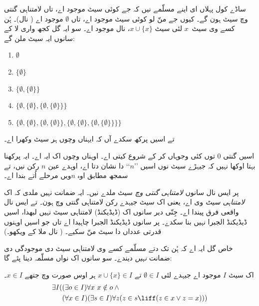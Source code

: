 \documentclass[../../../include/open-logic-section]{subfiles}
\begin{document}

ساڈے کول پہلاں ای اینے مسلّمے نیں کہ جے کوئی سیٹ موجود اے، تاں لامتناہی
گنتی وچ سیٹ ہون گے۔ کیوں جے منّ لو کوئی سیٹ موجود اے، تاں
$\emptyset$ موجود اے ( نال)۔
ہُن کسے وی سیٹ~$x$ لئی سیٹ $x \cup \{x\}$،
 نال موجود اے۔
سو ایہ گل کجھ واری لا کے سانوں ایہ سیٹ ملن گے:
\begin{enumerate}
	\item[0.] $\emptyset$ %
	\item[1.] $ \{\emptyset\}$ %
	\item[2.] $\{\emptyset, \{\emptyset\}\}$ %
	\item[3.] $\{\emptyset, \{\emptyset\}, \{\emptyset, \{\emptyset\}\}\}$ %
	\item[4.] $\{\emptyset, \{\emptyset\}, \{\emptyset, \{\emptyset\}\}, \{\emptyset, \{\emptyset\}, \{\emptyset, \{\emptyset\}\}\}\}$%
\end{enumerate}
تے اسیں پرکھ سکدے آں کہ ایہناں وچوں ہر سیٹ وکھرا اے۔

اسیں گنتی $0$ توں کئی وجوہاں کر کے شروع کیتی اے۔ اوہناں وچوں اک ایہ اے۔
ایہ پرکھنا بہتا اوکھا نہیں کہ جیہڑے سیٹ نوں اسیں ’’$n$‘‘ دا نشان دتا اے،
اوہدے عین $n$ رکن نیں، تے سمجھ مطابق اوہ $n$ویں مرحلے اُتے بندا اے۔

پر ایس نال سانوں \emph{لامتناہی گنتی وچ} سیٹ ملدے نیں۔ ایہ ضمانت نہیں
ملدی کہ اک \emph{لامتناہی سیٹ} وی اے، یعنی اک سیٹ جیہدے رکن لامتناہی
گنتی وچ ہون۔ تے ایس نال واقعی فرق پیندا اے۔ جِنّی دیر سانوں اک (ڈیڈیکنڈ)
لامتناہی سیٹ نہیں لبھدا، اسیں ڈیڈیکنڈ الجبرا نہیں بنا سکدے۔ پر سانوں
ڈیڈیکنڈ الجبرا چاہیدا اے تاں جو اسیں اوہنوں قدرتی عدداں دا سیٹ منّ سکیے۔
( نال ملا کے ویکھو۔)

خاص گل ایہ اے کہ ہُن تک دتے مسلّمے کسے وی لامتناہی سیٹ دی موجودگی دی
ضمانت \emph{نہیں} دیندے۔ سو سانوں اک نواں مسلّمہ دینا پئے گا:

\begin{axiom}[لامتناہیت]
اک سیٹ $I$ موجود اے جیہدے لئی $\emptyset \in I$ تے $x \cup \{x\} \in I$ ہر اوس صورت وچ جتھے $x \in I$۔
\begin{align*}
	\exists I( & (\exists o \in I)\forall x\ x \notin o \land {}\\
	& (\forall x \in I)(\exists s \in I)\forall z(z \in s \liff (z \in x \lor z = x)))
\end{align*}
\end{axiom}
\end{document}
